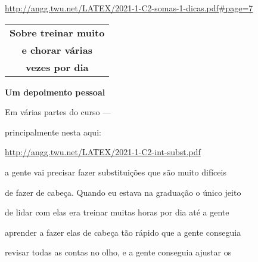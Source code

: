 \documentclass[oneside,12pt]{article}
\begin{document}
\ssk

{\footnotesize

\url{http://angg.twu.net/LATEX/2021-1-C2-somas-1-dicas.pdf\#page=7}

}


\newpage


\thispagestyle{empty}

\begin{center}

\vspace*{1.5cm}

\begin{tabular}{c}
{\bf \Large Sobre treinar muito} \\
{\bf \Large e chorar várias} \\
{\bf \Large vezes por dia} \\
\end{tabular}

\end{center}

\newpage


\vspace*{-0.5cm}

{\bf Um depoimento pessoal}

Em várias partes do curso ---

principalmente nesta aqui:

\ssk

{\scriptsize

\url{http://angg.twu.net/LATEX/2021-1-C2-int-subst.pdf}

}

\msk

a gente vai precisar fazer substituições que são muito difíceis

de fazer de cabeça. Quando eu estava na graduação o único jeito

de lidar com elas era treinar muitas horas por dia até a gente

aprender a fazer elas de cabeça tão rápido que a gente conseguia

revisar todas as contas no olho, e a gente conseguia ajustar os
\end{document}
